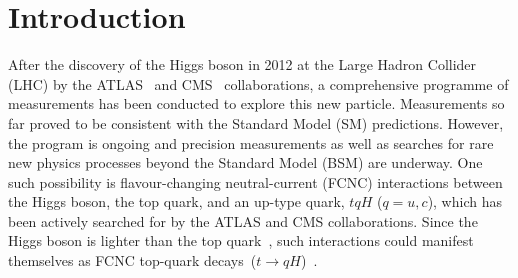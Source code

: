 \section{Introduction}
\label{sec:intro}
After the discovery of the Higgs boson in 2012 at the Large Hadron Collider (LHC) by the ATLAS~\cite{Aad:2012tfa} and 
CMS~\cite{Chatrchyan:2012ufa} collaborations, 
a comprehensive programme of measurements %
has been conducted to explore this new particle. Measurements so far proved to be consistent with the Standard Model (SM) predictions. 
However, the program is ongoing and precision measurements as well as searches for rare new physics processes beyond the Standard Model (BSM)
are underway. One such possibility is flavour-changing neutral-current (FCNC) interactions between the Higgs boson, 
the top quark, and an up-type quark, $tqH$ ($q=u, c$), which has been actively searched for by the ATLAS and CMS collaborations.  
Since the Higgs boson is lighter than the top quark~\cite{Aad:2015zhl},
such interactions could manifest themselves as FCNC top-quark decays~($t\to qH$)~\cite{Agashe:2013hma}.

